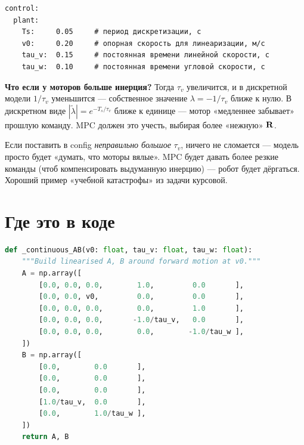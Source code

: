 \begin{codebox}[title={\filepath{config.yaml}, секция \texttt{control.plant}}]
\begin{verbatim}
control:
  plant:
    Ts:     0.05     # период дискретизации, с
    v0:     0.20     # опорная скорость для линеаризации, м/с
    tau_v:  0.15     # постоянная времени линейной скорости, с
    tau_w:  0.10     # постоянная времени угловой скорости, с
\end{verbatim}
\end{codebox}

\begin{whatifbox}
\textbf{Что если у моторов больше инерция?} Тогда $\tau_v$ увеличится,
и в дискретной модели $1/\tau_v$ уменьшится --- собственное значение
$\lambda = -1/\tau_v$ ближе к нулю. В дискретном виде $|\tilde{\lambda}|
= e^{-T_s/\tau_v}$ ближе к единице --- мотор «медленнее забывает» прошлую
команду. MPC должен это учесть, выбирая более «нежную» $\mathbf{R}$.

Если поставить в config \emph{неправильно большое} $\tau_v$, ничего
не сломается --- модель просто будет «думать, что моторы вялые». MPC
будет давать более резкие команды (чтоб компенсировать выдуманную
инерцию) --- робот будет дёргаться. Хороший пример «учебной катастрофы»
из задачи курсовой.
\end{whatifbox}

\section{Где это в коде}

\begin{codebox}[title={\filepath{pi\_nodes/control/state\_space\_model.py:29}}]
\begin{lstlisting}[language=Python]
def _continuous_AB(v0: float, tau_v: float, tau_w: float):
    """Build linearised A, B around forward motion at v0."""
    A = np.array([
        [0.0, 0.0, 0.0,        1.0,         0.0       ],
        [0.0, 0.0, v0,         0.0,         0.0       ],
        [0.0, 0.0, 0.0,        0.0,         1.0       ],
        [0.0, 0.0, 0.0,       -1.0/tau_v,   0.0       ],
        [0.0, 0.0, 0.0,        0.0,        -1.0/tau_w ],
    ])
    B = np.array([
        [0.0,        0.0       ],
        [0.0,        0.0       ],
        [0.0,        0.0       ],
        [1.0/tau_v,  0.0       ],
        [0.0,        1.0/tau_w ],
    ])
    return A, B
\end{lstlisting}
\end{codebox}

